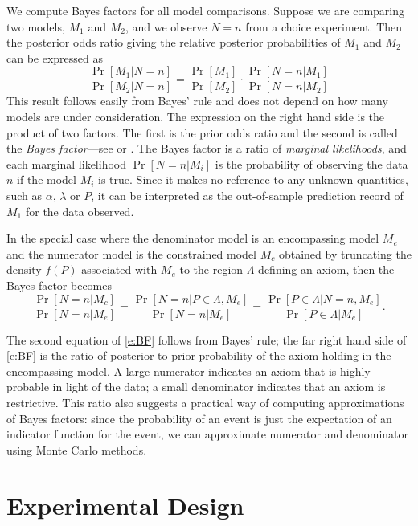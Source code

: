 \documentclass[11pt,letter]{article}
\begin{document}
We compute Bayes factors for all model comparisons.
Suppose we are comparing two models, $M_1$ and $M_2$, and we observe $N=n$ from a choice experiment.
Then the posterior odds ratio giving the relative posterior probabilities of $M_1$ and $M_2$ can be expressed as
\[
  \frac{\Pr[M_1|N=n]}{\Pr[M_2|N=n]} = \frac{\Pr[M_1]}{\Pr[M_2]}
  \cdot
  \frac{\Pr[N=n|M_1]}{\Pr[N=n|M_2]}
\]
This result follows easily from Bayes' rule and does not depend on how many models are under consideration.
The expression on the right hand side is the product of two factors.
The first is the prior odds ratio and the second is called the {\em Bayes factor}---see  or .
The Bayes factor is a ratio of {\em marginal likelihoods}, and each marginal likelihood $\Pr[N=n|M_i]$ is the probability of observing the data $n$ if the model $M_i$ is true.
Since it makes no reference to any unknown quantities, such as $\alpha$, $\lambda$ or $P$, it can be interpreted as the out-of-sample prediction record of $M_1$ for the data observed.

In the special case where the denominator model is an encompassing model $M_e$ and the numerator model is the constrained model $M_c$ obtained by truncating the density $f(P)$ associated with $M_e$ to the region $\Lambda$ defining an axiom, then the Bayes factor becomes
\begin{equation}\label{e:BF}
  \frac{\Pr[N=n|M_c]}{\Pr[N=n|M_e]} =
  \frac{\Pr[N=n|P \in \Lambda,M_e]}{\Pr[N=n|M_e]} = \frac{\Pr[P \in \Lambda|N=n,M_e]}{\Pr[P \in \Lambda|M_e]}.
\end{equation}


The second equation of \eqref{e:BF} follows from Bayes' rule; the far right hand side of \eqref{e:BF} is the ratio of posterior to prior probability of the axiom holding in the encompassing model.
A large numerator indicates an axiom that is highly probable in light of the data; a small denominator indicates that an axiom is restrictive.
This ratio also suggests a practical way of computing approximations of Bayes factors: since the probability of an event is just the expectation of an indicator function for the event, we can approximate numerator and denominator using Monte Carlo methods.

\section{Experimental Design}\label{s:design}
\end{document}
